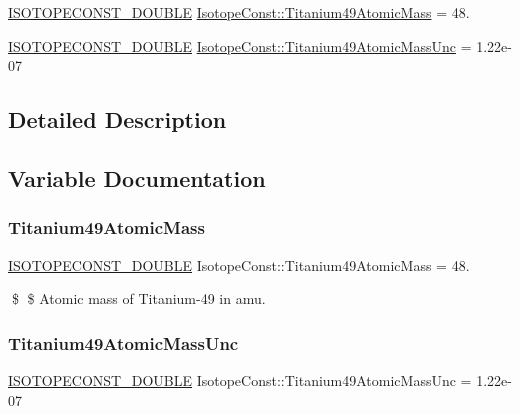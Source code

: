 \begin{DoxyCompactItemize}
\item 
\mbox{\hyperlink{group___isotope_const-_macros_ga8f45a7272ce02c0b4c65c44636ed719a}{I\+S\+O\+T\+O\+P\+E\+C\+O\+N\+S\+T\+\_\+\+D\+O\+U\+B\+LE}} \mbox{\hyperlink{group___isotope_const-_titanium-_ti49_ga97e1bd1332d4fc29625f4b54559e36e5}{Isotope\+Const\+::\+Titanium49\+Atomic\+Mass}} = 48.
\item 
\mbox{\hyperlink{group___isotope_const-_macros_ga8f45a7272ce02c0b4c65c44636ed719a}{I\+S\+O\+T\+O\+P\+E\+C\+O\+N\+S\+T\+\_\+\+D\+O\+U\+B\+LE}} \mbox{\hyperlink{group___isotope_const-_titanium-_ti49_ga0a270a73251e522ea7d1f7d0b432f811}{Isotope\+Const\+::\+Titanium49\+Atomic\+Mass\+Unc}} = 1.\+22e-\/07
\end{DoxyCompactItemize}


\subsection{Detailed Description}


\subsection{Variable Documentation}
\mbox{\label{group___isotope_const-_titanium-_ti49_ga97e1bd1332d4fc29625f4b54559e36e5}} 
\subsubsection{\texorpdfstring{Titanium49\+Atomic\+Mass}{Titanium49AtomicMass}}
{\footnotesize\ttfamily \mbox{\hyperlink{group___isotope_const-_macros_ga8f45a7272ce02c0b4c65c44636ed719a}{I\+S\+O\+T\+O\+P\+E\+C\+O\+N\+S\+T\+\_\+\+D\+O\+U\+B\+LE}} Isotope\+Const\+::\+Titanium49\+Atomic\+Mass = 48.}

\$ \$ Atomic mass of Titanium-\/49 in amu. \mbox{\label{group___isotope_const-_titanium-_ti49_ga0a270a73251e522ea7d1f7d0b432f811}} 
\subsubsection{\texorpdfstring{Titanium49\+Atomic\+Mass\+Unc}{Titanium49AtomicMassUnc}}
{\footnotesize\ttfamily \mbox{\hyperlink{group___isotope_const-_macros_ga8f45a7272ce02c0b4c65c44636ed719a}{I\+S\+O\+T\+O\+P\+E\+C\+O\+N\+S\+T\+\_\+\+D\+O\+U\+B\+LE}} Isotope\+Const\+::\+Titanium49\+Atomic\+Mass\+Unc = 1.\+22e-\/07}

